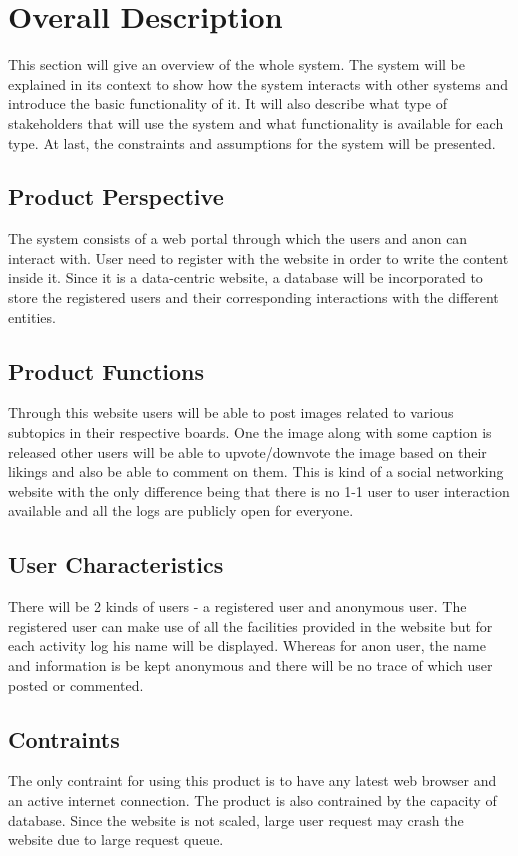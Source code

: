 \documentclass[12pt]{report}
\begin{document}
\chapter{Overall Description}
This section will give an overview of the whole system. The system will be explained in its context to show how the system interacts with other systems and introduce the basic functionality of it. It will also describe what type of stakeholders that will use the system and what functionality is available for each type. At last, the constraints and assumptions for the system will be presented.

\section{Product Perspective}
The system consists of a web portal through which the users and anon can interact with. User need to register with the website in order to write the content inside it. Since it is a data-centric website, a database will be incorporated to store the registered users and their corresponding interactions with the different entities.

\section{Product Functions}
Through this website users will be able to post images related to various subtopics in their respective boards. One the image along with some caption is released other users will be able to upvote/downvote the image based on their likings and also be able to comment on them. This is kind of a social networking website with the only difference being that there is no 1-1 user to user interaction available and all the logs are publicly open for everyone.

\section{User Characteristics}
There will be 2 kinds of users - a registered user and anonymous user. The registered user can make use of all the facilities provided in the website but for each activity log his name will be displayed. Whereas for anon user, the name and information is be kept anonymous and there will be no trace of which user posted or commented.

\section{Contraints}
The only contraint for using this product is to have any latest web browser and an active internet connection. The product is also contrained by the capacity of database. Since the website is not scaled, large user request may crash the website due to large request queue.
\end{document}
